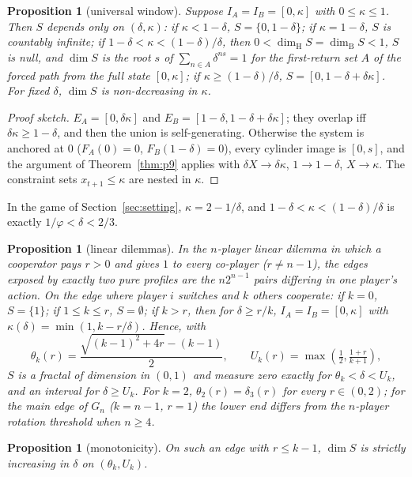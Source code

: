 \documentclass[11pt]{amsart}
\newtheorem{proposition}[theorem]{Proposition}
\theoremstyle{remark}
\newcommand{\dimH}{\dim_{\mathrm H}}
\newcommand{\dimB}{\dim_{\mathrm B}}
\begin{document}
\begin{proposition}[universal window]\label{prop:H}
Suppose $I_A=I_B=[0,\kappa]$ with $0\le\kappa\le1$. Then $S$ depends only on $(\delta,\kappa)$: if $\kappa<1-\delta$, $S=\{0,1-\delta\}$; if $\kappa=1-\delta$, $S$ is countably infinite; if $1-\delta<\kappa<(1-\delta)/\delta$, then $0<\dimH S=\dimB S<1$, $S$ is null, and $\dim S$ is the root $s$ of $\sum_{n\in A}\delta^{ns}=1$ for the first-return set $A$ of the forced path from the full state $[0,\kappa]$; if $\kappa\ge(1-\delta)/\delta$, $S=[0,1-\delta+\delta\kappa]$. For fixed $\delta$, $\dim S$ is non-decreasing in $\kappa$.
\end{proposition}

\begin{proof}[Proof sketch]
$E_A=[0,\delta\kappa]$ and $E_B=[1-\delta,1-\delta+\delta\kappa]$; they overlap iff $\delta\kappa\ge1-\delta$, and then the union is self-generating. Otherwise the system is anchored at $0$ ($F_A(0)=0$, $F_B(1-\delta)=0$), every cylinder image is $[0,s]$, and the argument of Theorem~\ref{thm:p9} applies with $\delta X\to\delta\kappa$, $1\to1-\delta$, $X\to\kappa$. The constraint sets $x_{t+1}\le\kappa$ are nested in $\kappa$.
\end{proof}

In the game of Section~\ref{sec:setting}, $\kappa=2-1/\delta$, and $1-\delta<\kappa<(1-\delta)/\delta$ is exactly $1/\varphi<\delta<2/3$.

\begin{proposition}[linear dilemmas]\label{prop:G}
In the $n$-player linear dilemma in which a cooperator pays $r>0$ and gives $1$ to every co-player ($r\ne n-1$), the edges exposed by exactly two pure profiles are the $n2^{n-1}$ pairs differing in one player's action. On the edge where player $i$ switches and $k$ others cooperate: if $k=0$, $S=\{1\}$; if $1\le k\le r$, $S=\emptyset$; if $k>r$, then for $\delta\ge r/k$, $I_A=I_B=[0,\kappa]$ with $\kappa(\delta)=\min(1,k-r/\delta)$. Hence, with
\[
\theta_k(r)=\frac{\sqrt{(k-1)^2+4r}-(k-1)}{2},\qquad U_k(r)=\max\!\left(\tfrac12,\tfrac{1+r}{k+1}\right),
\]
$S$ is a fractal of dimension in $(0,1)$ and measure zero exactly for $\theta_k<\delta<U_k$, and an interval for $\delta\ge U_k$. For $k=2$, $\theta_2(r)=\delta_3(r)$ for every $r\in(0,2)$; for the main edge of $G_n$ ($k=n-1$, $r=1$) the lower end differs from the $n$-player rotation threshold when $n\ge4$.
\end{proposition}

\begin{proposition}[monotonicity]\label{prop:M}
On such an edge with $r\le k-1$, $\dim S$ is strictly increasing in $\delta$ on $(\theta_k,U_k)$.
\end{proposition}
\end{document}
